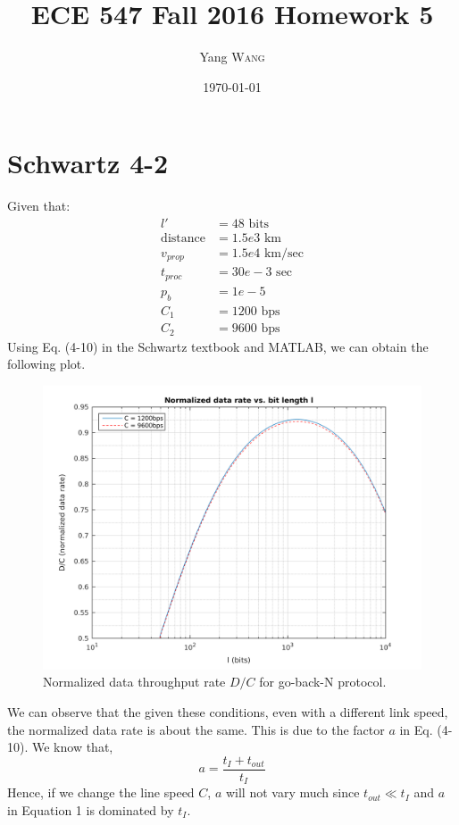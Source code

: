 \documentclass{article}
\title{ECE 547 Fall 2016 Homework 5} %
\author{Yang \textsc{Wang}}  %
\date{\today} %
\begin{document}
\maketitle %


\section*{Schwartz 4-2}
	Given that:
	\begin{align*}
		l' &= 48 \text{ bits} \\
		\text{distance} &= 1.5e3 \text{ km} \\
		v_{prop} &= 1.5e4 \text{ km/sec} \\
		t_{proc} &= 30e-3 \text{ sec} \\
		p_b &= 1e-5 \\
		C_1 &= 1200 \text{ bps} \\
		C_2 &= 9600 \text{ bps}
	\end{align*}
	Using Eq. (4-10) in the Schwartz textbook and MATLAB, we can obtain the
	following plot.
	\begin{figure}[!hbt]
		\centering
		\includegraphics[width=0.6\linewidth]{hw5_1_dr.png}
		\caption{Normalized data throughput rate $D/C$ for go-back-N protocol.}
	\end{figure}
	We can observe that the given these conditions, even with a different link
	speed, the normalized data rate is about the same. This is due to the factor
	$a$ in Eq. (4-10). We know that,
	\begin{equation}
		a = \frac{t_I + t_{out}}{t_I}
	\end{equation}
	Hence, if we change the line speed $C$, $a$ will not vary much since
	$t_{out} \ll t_I$ and $a$ in Equation 1 is dominated by $t_I$.
\end{document}
